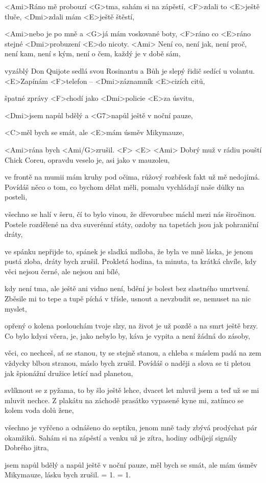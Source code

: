 
\zs
<Ami>Ráno mě probouzí <G>tma, sahám si na zápěstí,
<F>zdali to <E>ještě tluče, <Dmi>zdali mám <E>ještě 
štěstí,

<Ami>nebo je po mně a <G>já mám voskované boty,
<F>ráno co <E>ráno stejné <Dmi>probuzení <E>do nicoty. <Ami>
\ks
\zs
Není co, není jak, není proč, není kam,
není s kým, není o čem, každý je v době sám,

vyzáblý Don Quijote sedlá svou Rosinantu
a Bůh je slepý řidič sedící u volantu.
\ks
\zr
<E>Zapínám <F>telefon -- <Dmi>záznamník <E>cizích citů,

špatné zprávy <F>chodí jako <Dmi>policie <E>za úsvitu,

<Dmi>jsem napůl bdělý a <G7>napůl ještě v noční pauze,

<C>měl bych se smát, ale <E>mám úsměv Mikymauze,

<Ami>rána bych <Ami/G>zrušil. <F> <E> <Ami>
\kr
\zs
Dobrý muž v rádiu pouští Chick Coreu,
opravdu veselo je, asi jako v mauzoleu,

ve frontě na mumii mám kruhy pod očima,
růžový rozbřesk fakt už mě nedojímá.
\ks
\zs
Povídáš něco o tom, co bychom dělat měli,
pomalu vychládají naše důlky na posteli,

všechno se halí v šeru, čí to bylo vinou,
že dřevorubec máchl mezi nás širočinou.
\ks
\zr
Postele rozdělené na dva suverénní státy,
ozdoby na tapetách jsou jak pohraniční dráty,

ve spánku nepřijde to, spánek je sladká mdloba,
že byla ve mně láska, je jenom pustá zloba,
dráty bych zrušil.
\kr
\zs
Prokletá hodina, ta minuta, ta krátká chvíle,
kdy věci nejsou černé, ale nejsou ani bílé,

kdy není tma, ale ještě ani vidno není,
bdění je bolest bez slastného umrtvení.
\ks
\zs
Zběsile mi to tepe a tupě píchá v třísle,
usnout a nevzbudit se, nemuset na nic myslet,

opřený o kolena poslouchám tvoje slzy,
na život je už pozdě a na smrt ještě brzy.
\ks
\zr
Co bylo kdysi včera, je, jako nebylo by,
káva je vypita a není žádná do zásoby,

věci, co nechceš, ať se stanou, ty se stejně stanou,
a chleba s máslem padá na zem vždycky blbou stranou,
máslo bych zrušil.
\kr
\zs
Povídáš o naději a slova se ti pletou
jak špionážní družice letící nad planetou,

svlíknout se z pyžama, to by šlo ještě lehce,
dvacet let mluvil jsem a teď už se mi mluvit nechce.
\ks
\zs
Z plakátu na záchodě prasátko vypasené
kyne mi, zatímco se kolem voda dolů žene,

všechno je vyřčeno a odnášeno do septiku,
jenom mně tady zbývá prodýchat pár okamžiků.
\ks
\zr
Sahám si na zápěstí a venku už je zítra,
hodiny odbíjejí signály Dobrého jitra,

jsem napůl bdělý a napůl ještě v noční pauze,
měl bych se smát, ale mám úsměv Mikymauze,
lásku bych zrušil.
\kr
\zs
= 1.
\ks
\zs
= 1.
\ks
\kp
